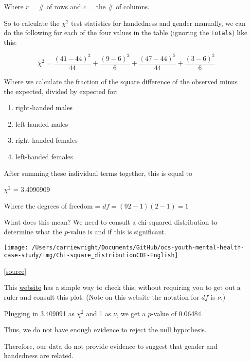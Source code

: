 \documentclass[
]{article}
\providecommand{\tightlist}{%
  \setlength{\itemsep}{0pt}\setlength{\parskip}{0pt}}
\begin{document}
Where \(r\) = \# of rows and \(c\) = the \# of columns.

So to calculate the \({\chi}^2\) test statistics for handedness and
gender manually, we can do the following for each of the four values in
the table (ignoring the \texttt{Totals}) like this:

\[{\chi}^2 =  \frac{(41-44)^2}{44} + \frac{(9-6)^2}{6}+ \frac{(47-44)^2}{44}+ \frac{(3-6)^2}{6}\]

Where we calculate the fraction of the square difference of the observed
minus the expected, divided by expected for:

\begin{enumerate}
\def\labelenumi{\arabic{enumi}.}
\tightlist
\item
  right-handed males
\item
  left-handed males
\item
  right-handed females
\item
  left-handed females
\end{enumerate}

After summing these individual terms together, this is equal to

\({\chi}^2\) = 3.4090909

Where the degrees of freedom = \(df = (92-1)(2-1) = 1\)

What does this mean? We need to consult a chi-squared distribution to
determine what the \(p\)-value is and if this is significant.

\begin{center}\texttt{[image: /Users/carriewright/Documents/GitHub/ocs-youth-mental-health-case-study/img/Chi-square\_distributionCDF-English]} \end{center}

\href{https://en.wikipedia.org/wiki/Chi-squared_test\#/media/File:Chi-square_distributionCDF-English.png}{{[}source{]}}

This
\href{http://homepage.divms.uiowa.edu/~mbognar/applets/chisq.html}{website}
has a simple way to check this, without requiring you to get out a ruler
and consult this plot. (Note on this website the notation for \(df\) is
\({\nu}\).)

Plugging in 3.409091 as \({\chi}^2\) and 1 as \({\nu}\), we get a
\(p\)-value of 0.06484.

Thus, we do not have enough evidence to reject the null hypothesis.

Therefore, our data do not provide evidence to suggest that gender and
handedness are related.
\end{document}
